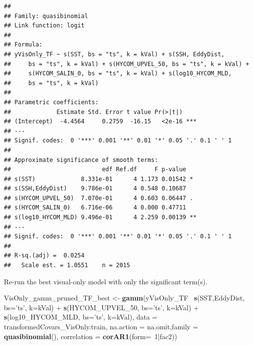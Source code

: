 \documentclass[11pt,]{article}
\newenvironment{Shaded}{\begin{snugshade}}{\end{snugshade}}
\newcommand{\KeywordTok}[1]{\textcolor[rgb]{0.13,0.29,0.53}{\textbf{{#1}}}}
\newcommand{\DataTypeTok}[1]{\textcolor[rgb]{0.13,0.29,0.53}{{#1}}}
\newcommand{\DecValTok}[1]{\textcolor[rgb]{0.00,0.00,0.81}{{#1}}}
\newcommand{\StringTok}[1]{\textcolor[rgb]{0.31,0.60,0.02}{{#1}}}
\newcommand{\NormalTok}[1]{{#1}}
\begin{document}
\begin{verbatim}
## 
## Family: quasibinomial 
## Link function: logit 
## 
## Formula:
## yVisOnly_TF ~ s(SST, bs = "ts", k = kVal) + s(SSH, EddyDist, 
##     bs = "ts", k = kVal) + s(HYCOM_UPVEL_50, bs = "ts", k = kVal) + 
##     s(HYCOM_SALIN_0, bs = "ts", k = kVal) + s(log10_HYCOM_MLD, 
##     bs = "ts", k = kVal)
## 
## Parametric coefficients:
##             Estimate Std. Error t value Pr(>|t|)    
## (Intercept)  -4.4564     0.2759  -16.15   <2e-16 ***
## ---
## Signif. codes:  0 '***' 0.001 '**' 0.01 '*' 0.05 '.' 0.1 ' ' 1
## 
## Approximate significance of smooth terms:
##                          edf Ref.df     F p-value   
## s(SST)             8.331e-01      4 1.173 0.01542 * 
## s(SSH,EddyDist)    9.786e-01      4 0.548 0.10687   
## s(HYCOM_UPVEL_50)  7.070e-01      4 0.603 0.06447 . 
## s(HYCOM_SALIN_0)   6.716e-06      4 0.000 0.47711   
## s(log10_HYCOM_MLD) 9.496e-01      4 2.259 0.00139 **
## ---
## Signif. codes:  0 '***' 0.001 '**' 0.01 '*' 0.05 '.' 0.1 ' ' 1
## 
## R-sq.(adj) =  0.0254   
##   Scale est. = 1.0551    n = 2015
\end{verbatim}

Re-run the best visual-only model with only the significant term(s).

\begin{Shaded}
\begin{Highlighting}[]
\NormalTok{VisOnly_gamm_pruned_TF_best <-}\StringTok{ }\KeywordTok{gamm}\NormalTok{(yVisOnly_TF~}\StringTok{ }\KeywordTok{s}\NormalTok{(SST,EddyDist, }\DataTypeTok{bs=}\StringTok{'ts'}\NormalTok{, }\DataTypeTok{k=}\NormalTok{kVal)}
                               \NormalTok{+}\StringTok{ }\KeywordTok{s}\NormalTok{(HYCOM_UPVEL_50, }\DataTypeTok{bs=}\StringTok{'ts'}\NormalTok{, }\DataTypeTok{k=}\NormalTok{kVal)}
                               \NormalTok{+}\StringTok{ }\KeywordTok{s}\NormalTok{(log10_HYCOM_MLD, }\DataTypeTok{bs=}\StringTok{'ts'}\NormalTok{, }\DataTypeTok{k=}\NormalTok{kVal),}
                               \DataTypeTok{data =} \NormalTok{transformedCovars_VisOnly.train,}
                               \DataTypeTok{na.action =} \NormalTok{na.omit,}\DataTypeTok{family =} \KeywordTok{quasibinomial}\NormalTok{(),}
                               \DataTypeTok{correlation =} \KeywordTok{corAR1}\NormalTok{(}\DataTypeTok{form=}\NormalTok{~}\DecValTok{1}\NormalTok{|fac2))}
\end{Highlighting}
\end{Shaded}

\begin{Shaded}
\end{Shaded}
\end{document}
